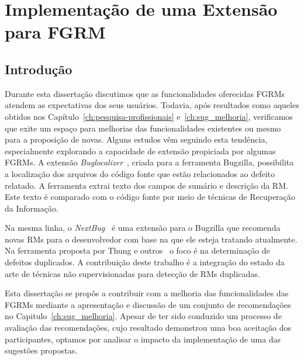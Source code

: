 \chapter{Implementação de uma Extensão para FGRM}
\label{ch:implemtacao_extensao}

\section{Introdução}
\label{sec:implemtacao_extensao_intro}

Durante esta dissertação discutimos que as funcionalidades oferecidas FGRMs
atendem as expectativas dos seus usuários. Todavia, após resultados como aqueles
obtidos nos Capítulo~\ref{ch:pesquisa-profissionais} e~\ref{ch:sug_melhoria},
verificamos que exite um espaço para melhorias das funcionalidades existentes ou
mesmo para a proposição de novas. Alguns estudos vêm seguindo esta tendência,
especialmente explorando a capacidade de extensão propiciada por algumas FGRMs.
A extensão \textit{Buglocalizer}~\cite{Thung:2014:BIT:2635868.2661678}, criada
para a ferramenta Bugzilla, possibilita a localização dos arquivos do código
fonte que estão relacionados ao defeito relatado. A ferramenta extrai texto dos
campos de sumário e descrição da RM\@. Este texto é comparado com o código fonte
por meio de técnicas de Recuperação da Informação.

Na mesma linha, o \textit{NextBug}~\cite{101186} é uma extensão para o Bugzilla
que recomenda novas RMs para o desenvolvedor com base na que ele esteja tratando
atualmente. Na ferramenta proposta por Thung e
outros~\cite{Thung:2014:DIT:2642937.2648627} o foco é na determinação de
defeitos duplicados. A contribuição deste trabalho é a integração do estado da
arte de técnicas não supervisionadas para detecção de RMs duplicadas.

Esta dissertação se propôs a contribuir com a melhoria das funcionalidades das
FGRMs mediante a apresentação e discussão de um conjunto de recomendações no
Capitulo~\ref{ch:sug_melhoria}. Apesar de ter sido conduzido um processo de
avaliação das recomendações, cujo resultado demonstrou uma boa aceitação dos
participantes, optamos por analisar o impacto da implementação de uma das
sugestões propostas.

